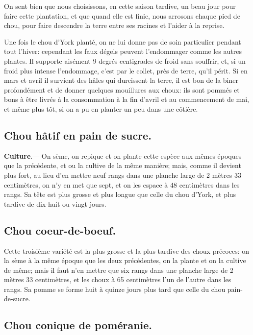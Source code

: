 \documentclass[10pt,a4paper]{book}
\begin{document}
On sent bien que nous choisissons, en cette saison tardive, un beau jour pour faire cette plantation, et que quand elle est finie, nous arrosons chaque pied de chou, pour faire descendre la terre entre ses racines et l'aider à la reprise.

Une fois le chou d'York planté, on ne lui donne pas de soin particulier pendant tout l'hiver: cependant les faux dégels peuvent l'endommager comme les autres plantes. Il supporte aisément 9 degrés centigrades de froid sans souffrir, et, si un froid plus intense l'endommage, c'est par le collet, près de terre, qu'il périt. Si en mars et avril il survient des hâles qui durcissent la terre, il est bon de la biner profondément et de donner quelques mouillures aux choux: ils sont pommés et bons à être livrés à la consommation à la fin d'avril et au commencement de mai, et même plus tôt, si on a pu en planter un peu dans une côtière.

\subsection{Chou hâtif en pain de sucre.}

\textbf{Culture}.--- On sème, on repique et on plante cette espèce aux mêmes époques que la précédente, et ou la cultive de la même manière; mais, comme il devient plus fort, au lieu d'en mettre neuf rangs dans une planche large de 2 mètres 33 centimètres, on n'y en met que sept, et on les espace à 48 centimètres dans les rangs. Sa tête est plus grosse et plus longue que celle du chou d'York, et plus tardive de dix-huit ou vingt jours.

\subsection{Chou coeur-de-boeuf.}

Cette troisième variété est la plus grosse et la plus tardive des choux précoces: on la sème à la même époque que les deux précédentes, on la plante et on la cultive de même; mais il faut n'en mettre que six rangs dans une planche large de 2 mètres 33 centimètres, et les choux à 65 centimètres l'un de l'autre dans les rangs. Sa pomme se forme huit à quinze jours plus tard que celle du chou pain-de-sucre.

\subsection{Chou conique de poméranie.}
\end{document}
